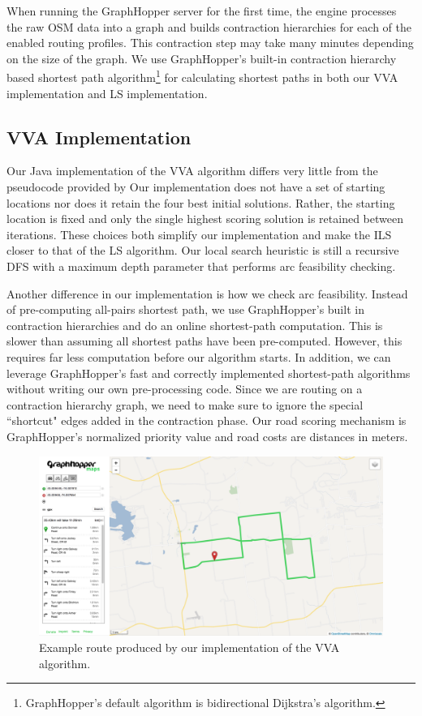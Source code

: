 \documentclass[honors]{union-cs-thesis}
\begin{document}
When running the GraphHopper server for the first time, the engine processes the raw OSM data into a graph and builds contraction hierarchies for each of the enabled routing profiles. This contraction step may take many minutes depending on the size of the graph. We use GraphHopper's built-in contraction hierarchy based shortest path algorithm\footnote{GraphHopper's default algorithm is bidirectional Dijkstra's algorithm.} for calculating shortest paths in both our VVA implementation and LS implementation.

\subsection{VVA Implementation}
Our Java implementation of the VVA algorithm differs very little from the pseudocode provided by \citeauthor{verbeeck2014extension} Our implementation does not have a set of starting locations nor does it retain the four best initial solutions. Rather, the starting location is fixed and only the single highest scoring solution is retained between iterations. These choices both simplify our implementation and make the ILS closer to that of the LS algorithm. Our local search heuristic is still a recursive DFS with a maximum depth parameter that performs arc feasibility checking.

Another difference in our implementation is how we check arc feasibility. Instead of pre-computing all-pairs shortest path, we use GraphHopper's built in contraction hierarchies and do an online shortest-path computation. This is slower than assuming all shortest paths have been pre-computed. However, this requires far less computation before our algorithm starts. In addition, we can leverage GraphHopper's fast and correctly implemented shortest-path algorithms without writing our own pre-processing code. Since we are routing on a contraction hierarchy graph, we need to make sure to ignore the special ``shortcut" edges added in the contraction phase. Our road scoring mechanism is GraphHopper's normalized priority value and road costs are distances in meters.

\begin{figure}
    \begin{center}
        \includegraphics[width=\textwidth]{figs/vva-route}
    \end{center}
    \caption[VVA example route]{Example route produced by our implementation of the VVA algorithm.}
    \label{fig:vva-example}
\end{figure}
\end{document}
